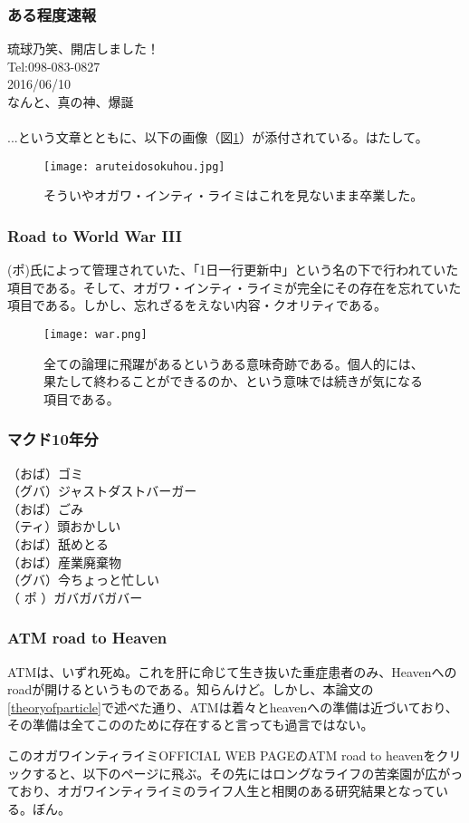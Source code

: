 \subsubsection{ある程度速報}
琉球乃笑、開店しました！\\
Tel:098-083-0827\\
2016/06/10\\
なんと、真の神、爆誕\\
 \\
...という文章とともに、以下の画像（図\ref{aruteidosokuhou}）が添付されている。はたして。

\begin{figure}[H]
  \centering
  \texttt{[image: aruteidosokuhou.jpg]}
  \caption{そういやオガワ・インティ・ライミはこれを見ないまま卒業した。}
\label{aruteidosokuhou}
\end{figure}

\subsubsection{Road to World War III}
(ポ)氏によって管理されていた、「1日一行更新中」という名の下で行われていた項目である。そして、オガワ・インティ・ライミが完全にその存在を忘れていた項目である。しかし、忘れざるをえない内容・クオリティである。

\begin{figure}[H]
  \centering
  \texttt{[image: war.png]}
  \caption{全ての論理に飛躍があるというある意味奇跡である。個人的には、果たして終わることができるのか、という意味では続きが気になる項目である。}
\label{war}
\end{figure}

\subsubsection{マクド10年分}
（おば）ゴミ \\
（グバ）ジャストダストバーガー \\
（おば）ごみ \\
（ティ）頭おかしい \\
（おば）舐めとる \\
（おば）産業廃棄物\\ 
（グバ）今ちょっと忙しい\\ 
（ ポ ）ガバガバガバー\\

\subsubsection{ATM road to Heaven}
ATMは、いずれ死ぬ。これを肝に命じて生き抜いた重症患者のみ、Heavenへのroadが開けるというものである。知らんけど。しかし、本論文の\ref{theoryofparticle}で述べた通り、ATMは着々とheavenへの準備は近づいており、その準備は全てこののために存在すると言っても過言ではない。\par
このオガワインティライミOFFICIAL WEB PAGEのATM road to heavenをクリックすると、以下のページに飛ぶ。その先にはロングなライフの苦楽園が広がっており、オガワインティライミのライフ人生と相関のある研究結果となっている。ぼん。\\

